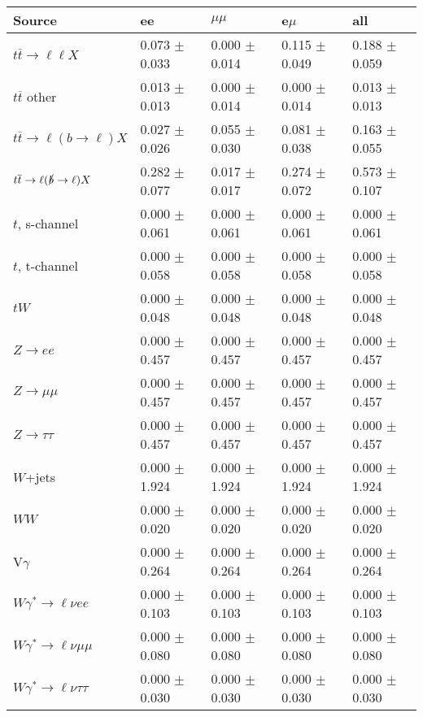 \begin{tabular}{l | l l l l}
\hline\hline
 Source  &  ee  &  $\mu\mu$  &  e$\mu$  &  all \\
\hline
$t\overline{t}\rightarrow \ell\ell X$ &  0.073 $\pm$  0.033 &  0.000 $\pm$  0.014 &  0.115 $\pm$  0.049 &  0.188 $\pm$  0.059\\
$t\overline{t}$ other &  0.013 $\pm$  0.013 &  0.000 $\pm$  0.014 &  0.000 $\pm$  0.014 &  0.013 $\pm$  0.013\\
$t\overline{t}\rightarrow \ell(b\rightarrow \ell)X$ &  0.027 $\pm$  0.026 &  0.055 $\pm$  0.030 &  0.081 $\pm$  0.038 &  0.163 $\pm$  0.055\\
$t\overline{t}\rightarrow \ell(\slashed{b}\rightarrow \ell)X$ &  0.282 $\pm$  0.077 &  0.017 $\pm$  0.017 &  0.274 $\pm$  0.072 &  0.573 $\pm$  0.107\\
\hline
$t$, s-channel &  0.000 $\pm$  0.061 &  0.000 $\pm$  0.061 &  0.000 $\pm$  0.061 &  0.000 $\pm$  0.061\\
$t$, t-channel &  0.000 $\pm$  0.058 &  0.000 $\pm$  0.058 &  0.000 $\pm$  0.058 &  0.000 $\pm$  0.058\\
$tW$ &  0.000 $\pm$  0.048 &  0.000 $\pm$  0.048 &  0.000 $\pm$  0.048 &  0.000 $\pm$  0.048\\
\hline
$Z\rightarrow ee$ &  0.000 $\pm$  0.457 &  0.000 $\pm$  0.457 &  0.000 $\pm$  0.457 &  0.000 $\pm$  0.457\\
$Z\rightarrow\mu\mu$ &  0.000 $\pm$  0.457 &  0.000 $\pm$  0.457 &  0.000 $\pm$  0.457 &  0.000 $\pm$  0.457\\
$Z\rightarrow\tau\tau$ &  0.000 $\pm$  0.457 &  0.000 $\pm$  0.457 &  0.000 $\pm$  0.457 &  0.000 $\pm$  0.457\\
$W$+jets &  0.000 $\pm$  1.924 &  0.000 $\pm$  1.924 &  0.000 $\pm$  1.924 &  0.000 $\pm$  1.924\\
$WW$ &  0.000 $\pm$  0.020 &  0.000 $\pm$  0.020 &  0.000 $\pm$  0.020 &  0.000 $\pm$  0.020\\
\hline
V$\gamma$ &  0.000 $\pm$  0.264 &  0.000 $\pm$  0.264 &  0.000 $\pm$  0.264 &  0.000 $\pm$  0.264\\
$W\gamma^{*}\rightarrow\ell\nu e e$ &  0.000 $\pm$  0.103 &  0.000 $\pm$  0.103 &  0.000 $\pm$  0.103 &  0.000 $\pm$  0.103\\
$W\gamma^{*}\rightarrow\ell\nu\mu\mu$ &  0.000 $\pm$  0.080 &  0.000 $\pm$  0.080 &  0.000 $\pm$  0.080 &  0.000 $\pm$  0.080\\
$W\gamma^{*}\rightarrow\ell\nu\tau\tau$ &  0.000 $\pm$  0.030 &  0.000 $\pm$  0.030 &  0.000 $\pm$  0.030 &  0.000 $\pm$  0.030\\

\end{tabular}
